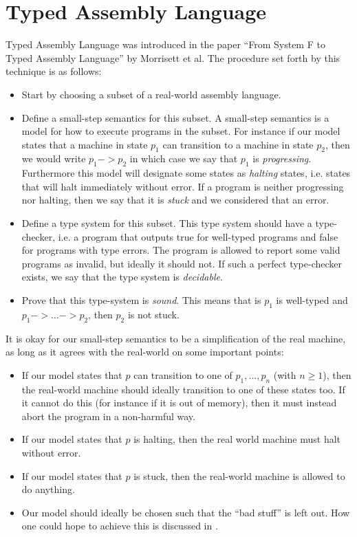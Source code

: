 \section{Typed Assembly Language}

Typed Assembly Language was introduced in the paper ``From System F to Typed
Assembly Language'' by Morrisett et al. The procedure set forth by this
technique is as follows:

\begin{itemize}
\item Start by choosing a subset of a real-world assembly language.

\item Define a small-step semantics for this subset. A small-step semantics is a
  model for how to execute programs in the subset. For instance if our model
  states that a machine in state $p_1$ can transition to a machine in state
  $p_2$, then we would write $p_1 -> p_2$ in which case we say that $p_1$ is
  \emph{progressing}. Furthermore this model will designate some states as
  \emph{halting} states, i.e. states that will halt immediately without
  error. If a program is neither progressing nor halting, then we say that it is
  \emph{stuck} and we considered that an error.

\item Define a type system for this subset. This type system should have a
  type-checker, i.e. a program that outputs true for well-typed programs and
  false for programs with type errors. The program is allowed to report some
  valid programs as invalid, but ideally it should not. If such a perfect
  type-checker exists, we say that the type system is \emph{decidable}.

\item Prove that this type-system is \emph{sound}. This means that is $p_1$ is
  well-typed and $p_1 -> \dots -> p_2$, then $p_2$ is not stuck.
\end{itemize}

It is okay for our small-step semantics to be a simplification of the real
machine, as long as it agrees with the real-world on some important
points:
\begin{itemize}
\item If our model states that $p$ can transition to one of $p_1, \dots, p_n$
  (with $n \geq 1$), then the real-world machine should ideally transition to
  one of these states too. If it cannot do this (for instance if it is out of
  memory), then it must instead abort the program in a non-harmful way.
\item If our model states that $p$ is halting, then the real world machine
  must halt without error.
\item If our model states that $p$ is stuck, then the real-world machine is
  allowed to do anything.
\item Our model should ideally be chosen such that the ``bad stuff'' is left
  out. How one could hope to achieve this is discussed in .
\end{itemize}

